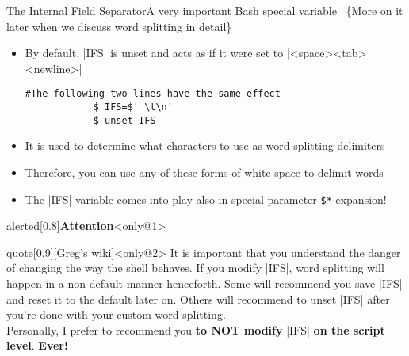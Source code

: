 \begin{frame}[fragile]{The Internal Field Separator}{A very important Bash special variable {\tiny~\{More on it later when we discuss word splitting in detail\}}}
    \vspace{-3mm}
    \begin{itemize}
        \item By default, \bash|IFS| is unset and acts as if it were set to \bash|<space><tab><newline>|
        \begin{lstlisting}[style=MyBash, numbers=none, xrightmargin=15mm, belowskip=-6mm]
            #The following two lines have the same effect
            $ IFS=$' \t\n'
            $ unset IFS
        \end{lstlisting}
        \item It is used to determine what characters to use as word splitting delimiters
        \item Therefore, you can use any of these forms of white space to delimit words
        \item The \bash|IFS| variable comes into play also in special parameter \texttt{\$*} expansion!
    \end{itemize}
    \vspace{-4mm}
    \begin{overlayarea}{\textwidth}{0.35\textheight}
        \begin{varblock}{alerted}[0.8\textwidth]{\Large \textbf{Attention}}<only@1>
        \end{varblock}
        \begin{varblock}{quote}[0.9\textwidth]{}[Greg's wiki]<only@2>
            It is important that you understand the danger of changing the way the shell behaves.
            If you modify \bash|IFS|, word splitting will happen in a non-default manner henceforth.
            Some will recommend you save \bash|IFS| and reset it to the default later on.
            Others will recommend to unset \bash|IFS| after you're done with your custom word splitting.\\
            Personally, I prefer to recommend you \textbf{to NOT modify} \bash|IFS| \textbf{on the script level}.
            \alert{\textbf{Ever!}}\\[-0.7em] ~
        \end{varblock}
    \end{overlayarea}
\end{frame}

